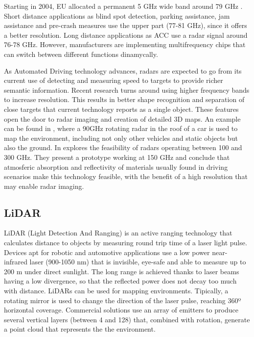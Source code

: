 Starting in 2004, EU allocated a permanent 5 GHz wide band around 79 GHz 
\cite{EULawandPublications2004}. 
Short distance applications as blind spot detection, parking assistance, jam 
assistance and pre-crash measures use the upper part (77-81 GHz), since it 
offers a better resolution. Long distance applications as ACC use a radar 
signal around 76-78 GHz. However, manufacturers are implementing multifrequency 
chips that can switch between different functions dinamycally.

As Automated Driving technology advances, radars are expected to go from its
current use of detecting and measuring speed to targets to provide richer
semantic information. 
Recent research turns around using higher frequency bands to increase
resolution. This results in better shape recognition and separation of close
targets that current technology reports as a single object.
These features open the door to radar imaging and creation of detailed 3D maps. 
An example can be found in \cite{Reina2015}, where a 90GHz rotating radar in
the roof of a car is used to map the environment, including not only other
vehicles and static objects but also the ground.
In \cite{Kohler2013} explores the feasibility of radars operating between 
100 and 300 GHz. They present a prototype working at 150 GHz and conclude 
that atmosferic absorption and reflectivity of materials usually found in 
driving scenarios make this technology feasible, with the benefit of a high
resolution that may enable radar imaging.



\subsection{LiDAR}
LiDAR (Light Detection And Ranging) is an active ranging technology that calculates distance to objects by measuring round trip time of a laser light pulse.
Devices apt for robotic and automotive applications use a low power 
near-infrared laser (900-1050 nm) that is invisible, eye-safe and able to 
measure up to 200 m under direct sunlight. The long range is achieved thanks to
laser beams having a low divergence, so that the reflected power does not decay
too much with distance.
LiDARs can be used for mapping environments. Tipically, a rotating mirror is used to change the direction of the laser pulse, reaching 360º horizontal coverage. Commercial solutions use an array of emitters to produce several vertical layers (between 4 and 128) that, combined with rotation, generate a point cloud that represents the the environment.

